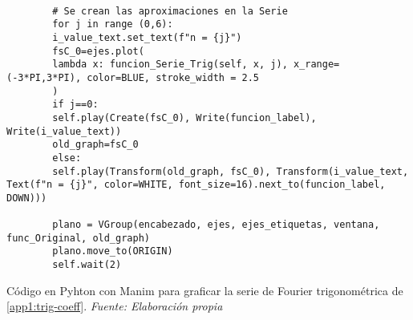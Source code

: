\begin{longlisting}
\begin{verbatim}
		
		# Se crean las aproximaciones en la Serie
		for j in range (0,6):
		i_value_text.set_text(f"n = {j}")
		fsC_0=ejes.plot(
		lambda x: funcion_Serie_Trig(self, x, j), x_range=(-3*PI,3*PI), color=BLUE, stroke_width = 2.5
		)
		if j==0:
		self.play(Create(fsC_0), Write(funcion_label), Write(i_value_text))
		old_graph=fsC_0
		else:
		self.play(Transform(old_graph, fsC_0), Transform(i_value_text, Text(f"n = {j}", color=WHITE, font_size=16).next_to(funcion_label, DOWN)))
		
		plano = VGroup(encabezado, ejes, ejes_etiquetas, ventana, func_Original, old_graph)
		plano.move_to(ORIGIN)
		self.wait(2)
	\end{verbatim}
	\caption[Código en Pyhton con Manim para graficar la serie de Fourier trigonométrica de \ref{app1:trig-coeff}.] {Código en Pyhton con Manim para graficar la serie de Fourier trigonométrica de \ref{app1:trig-coeff}. \textit{Fuente: Elaboración propia}} 
\end{longlisting}


